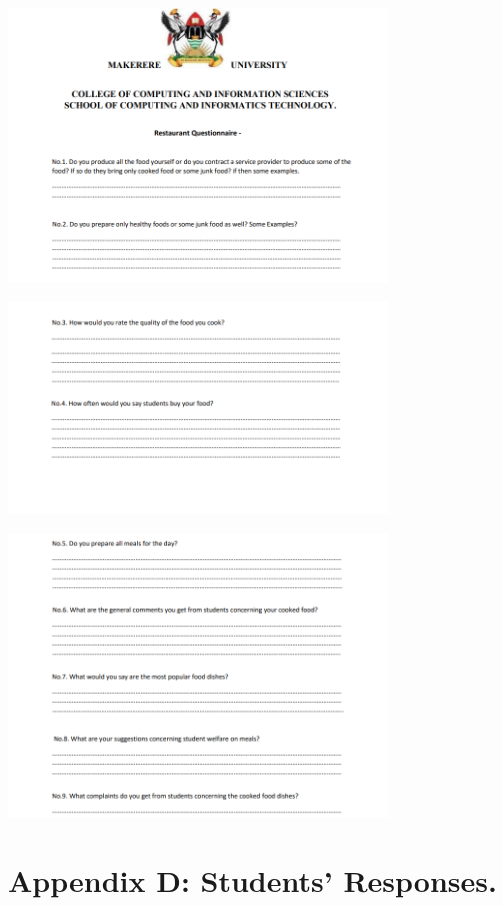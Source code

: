 \documentclass{article}
\begin{document}
\vspace{30pt}
\begin{center}

\includegraphics[width=380px]{images/restuarant1.PNG}

 \includegraphics[width=380px]{images/restuarant2.PNG}

\includegraphics[width=380px]{images/restuarant3.PNG} 


\end{center}


\newpage
\appendix
\renewcommand{\thesection}{} %
\section{Appendix D: Students' Responses. }
\end{document}
